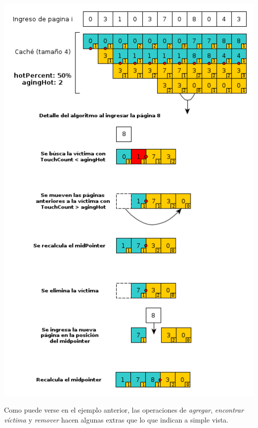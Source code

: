 \documentclass[11pt, a4paper, spanish]{article}
\begin{document}
\begin{center}
	\includegraphics[scale=0.65]{diagramas/TouchCountAlgorithm2.png}\\
\end{center}

Como puede verse en el ejemplo anterior, las operaciones de \textit{agregar}, \textit{encontrar v\'ictima} y \textit{remover} hacen algunas extras que lo que indican a simple vista.
\end{document}
